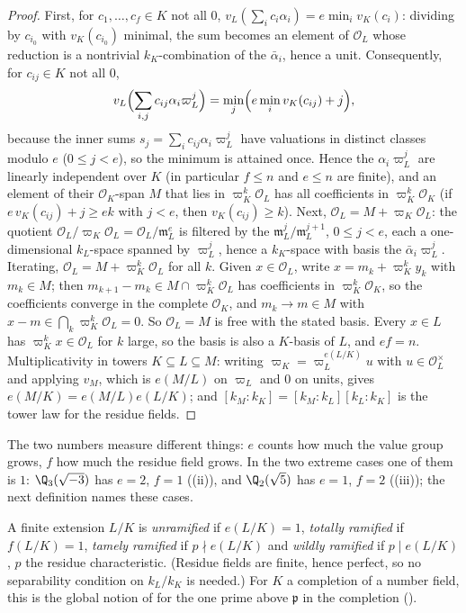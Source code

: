 \begin{proof}
First, for $c_1,\dots,c_f\in K$ not all $0$, $v_L(\sum_ic_i\alpha_i)=e\min_iv_K(c_i)$: dividing by $c_{i_0}$ with $v_K(c_{i_0})$ minimal, the sum becomes
an element of $\mathcal O_L$ whose reduction is a nontrivial $k_K$-combination of the $\bar\alpha_i$, hence a unit. Consequently, for
$c_{ij}\in K$ not all $0$,
\[
v_L\Bigl(\sum_{i,j}c_{ij}\alpha_i\varpi_L^j\Bigr)=\min_j\Bigl(e\min_iv_K(c_{ij})+j\Bigr),
\]
because the inner sums $s_j=\sum_ic_{ij}\alpha_i\varpi_L^j$ have valuations in distinct classes modulo $e$ ($0\le j<e$), so the minimum is attained
once. Hence the $\alpha_i\varpi_L^j$ are linearly independent over $K$ (in particular $f\le n$ and $e\le n$ are finite), and an element of their
$\mathcal O_K$-span $M$ that lies in $\varpi_K^k\mathcal O_L$ has all coefficients in $\varpi_K^k\mathcal O_K$ (if $e\,v_K(c_{ij})+j\ge ek$ with $j<e$, then
$v_K(c_{ij})\ge k$). Next, $\mathcal O_L=M+\varpi_K\mathcal O_L$: the quotient $\mathcal O_L/\varpi_K\mathcal O_L=\mathcal O_L/\mathfrak m_L^e$ is filtered by the
$\mathfrak m_L^j/\mathfrak m_L^{j+1}$, $0\le j<e$, each a one-dimensional $k_L$-space spanned by $\varpi_L^j$, hence a $k_K$-space with basis the
$\bar\alpha_i\varpi_L^j$. Iterating, $\mathcal O_L=M+\varpi_K^k\mathcal O_L$ for all $k$. Given $x\in\mathcal O_L$, write $x=m_k+\varpi_K^ky_k$ with $m_k\in M$;
then $m_{k+1}-m_k\in M\cap\varpi_K^k\mathcal O_L$ has coefficients in $\varpi_K^k\mathcal O_K$, so the coefficients converge in the complete $\mathcal O_K$, and
$m_k\to m\in M$ with $x-m\in\bigcap_k\varpi_K^k\mathcal O_L=0$. So $\mathcal O_L=M$ is free with the stated basis. Every $x\in L$ has $\varpi_K^kx\in\mathcal O_L$
for $k$ large, so the basis is also a $K$-basis of $L$, and $ef=n$. Multiplicativity in towers $K\subseteq L\subseteq M$: writing
$\varpi_K=\varpi_L^{e(L/K)}u$ with $u\in\mathcal O_L^\times$ and applying $v_M$, which is $e(M/L)$ on $\varpi_L$ and $0$ on units, gives
$e(M/K)=e(M/L)e(L/K)$; and $[k_M:k_K]=[k_M:k_L][k_L:k_K]$ is the tower law for the residue fields.
\end{proof}

The two numbers measure different things: $e$ counts how much the value group grows, $f$ how much the residue field grows. In the two
extreme cases one of them is $1$: $\Q_3(\sqrt{-3})$ has $e=2$, $f=1$ ((ii)), and $\Q_2(\sqrt5)$ has $e=1$, $f=2$
((iii)); the next definition names these cases.

\begin{definition}\label{def:local:ram-types}
A finite extension $L/K$ is \emph{unramified} if $e(L/K)=1$, \emph{totally ramified} if $f(L/K)=1$, \emph{tamely ramified} if $p\nmid e(L/K)$ and
\emph{wildly ramified} if $p\mid e(L/K)$, $p$ the residue characteristic. (Residue fields are finite, hence perfect, so no separability
condition on $k_L/k_K$ is needed.) For $K$ a completion of a number field, this is the global notion of  for the one prime above
$\mathfrak p$ in the completion ().
\end{definition}

